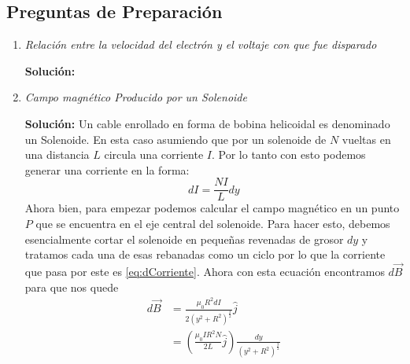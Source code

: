 \documentclass[a4paper, amsfonts, amssymb, amsmath, reprint, showkeys, nofootinbib, twoside]{revtex4-1}
\begin{document}
\subsection{Preguntas de Preparación}
\begin{enumerate}
  \item \textit{Relación entre la velocidad del electrón y el voltaje con que fue disparado}

    \textbf{Solución:}
    

  \item \textit{Campo magnético Producido por un Solenoide}
    
    \textbf{Solución:}
    Un cable enrollado en forma de bobina helicoidal es denominado un Solenoide. En esta caso asumiendo que por un solenoide de $N$ vueltas en una distancia $L$ circula una corriente $I$. Por lo tanto con esto podemos generar una corriente en la forma: 
\begin{equation}
  \label{eq:dCorriente}
  dI = \frac{NI}{L}dy
\end{equation}    
Ahora bien, para empezar podemos calcular el campo magnético en un punto $P$ que se encuentra en el eje central del solenoide. Para hacer esto, debemos esencialmente cortar el solenoide en pequeñas revenadas de grosor $dy$ y tratamos cada una de esas rebanadas como un ciclo por lo que la corriente que pasa por este es \ref{eq:dCorriente}. Ahora con esta ecuación encontramos $d\Vec{B}$ para que nos quede
 \begin{equation}
  \label{eq:dB}
  \begin{split}
    d\Vec{B}&=\frac{\mu_0R^2dI}{2\left( y^2+R^2 \right)^{\frac{3}{2}}}\hat{j} \\ &= \left( \frac{\mu_0IR^2N}{2L}\hat{j} \right) \frac{dy}{\left( y^2+R^2 \right)^{\frac{3}{2}}}
  \end{split}
\end{equation}


\end{enumerate}
\end{document}
